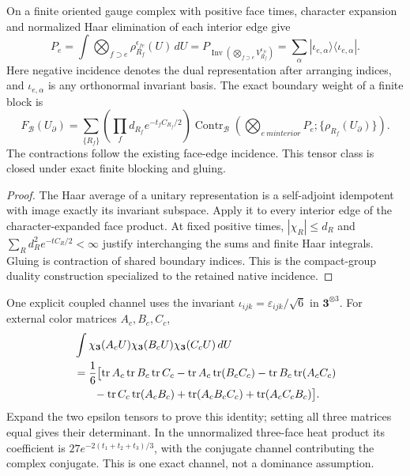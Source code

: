 \documentclass[12pt,a4paper]{article}
\begin{document}
\begin{theorem}
\label{p10:thm:v199-haar-interaction-compiler}
On a finite oriented gauge complex with positive face times, character
expansion and normalized Haar elimination of each interior edge give
\begin{equation}
 P_e=\int\bigotimes_{f\supset e}\rho_{R_f}^{\epsilon_{fe}}(U)\,dU
 =P_{\operatorname{Inv}(\bigotimes_{f\supset e}V_{R_f}^{\epsilon_{fe}})}
 =\sum_\alpha|\iota_{e,\alpha}\rangle\langle\iota_{e,\alpha}|.
 \label{p10:eq:v199-haar-projector}
\end{equation}
Here negative incidence denotes the dual representation after arranging
indices, and \(\iota_{e,\alpha}\) is any orthonormal invariant basis.
The exact boundary weight of a finite block is
\begin{equation}
 F_{\mathcal B}(U_\partial)=\sum_{\{R_f\}}
 \left(\prod_f d_{R_f}e^{-t_fC_{R_f}/2}\right)
 \operatorname{Contr}_{\mathcal B}
 \left(\bigotimes_{e\ {
m interior}}P_e;
          \{\rho_{R_f}(U_\partial)\}\right).
 \label{p10:eq:v199-blocked-tensor-weight}
\end{equation}
The contractions follow the existing face-edge incidence.  This tensor class
is closed under exact finite blocking and gluing.
\end{theorem}
\begin{proof}
The Haar average of a unitary representation is a self-adjoint idempotent
with image exactly its invariant subspace.  Apply it to every interior
edge of the character-expanded face product.  At fixed positive times,
\(|\chi_R|\le d_R\) and \(\sum_Rd_R^2e^{-tC_R/2}<\infty\) justify
interchanging the sums and finite Haar integrals.  Gluing is contraction of
shared boundary indices.  This is the compact-group duality construction
\cite{OecklPfeiffer2001Dual} specialized to the retained native incidence.
\end{proof}

One explicit coupled channel uses the invariant
\(\iota_{ijk}=\varepsilon_{ijk}/\sqrt6\) in \(\mathbf3^{\otimes3}\).
For external color matrices \(A_c,B_c,C_c\),
\begin{align}
 &\int\chi_{\mathbf3}(A_cU)\chi_{\mathbf3}(B_cU)
                  \chi_{\mathbf3}(C_cU)\,dU\nonumber\\
 &=\frac16\bigl[\operatorname{tr}A_c\operatorname{tr}B_c\operatorname{tr}C_c
 -\operatorname{tr}A_c\operatorname{tr}(B_cC_c)
 -\operatorname{tr}B_c\operatorname{tr}(A_cC_c)\nonumber\\
 &\hspace{1.8em}-\operatorname{tr}C_c\operatorname{tr}(A_cB_c)
 +\operatorname{tr}(A_cB_cC_c)+\operatorname{tr}(A_cC_cB_c)\bigr].
 \label{p10:eq:v199-three-face-channel}
\end{align}
Expand the two epsilon tensors to prove this identity; setting all three
matrices equal gives their determinant.  In the unnormalized three-face
heat product its coefficient is \(27e^{-2(t_1+t_2+t_3)/3}\), with the
conjugate channel contributing the complex conjugate.  This is one exact
channel, not a dominance assumption.
\end{document}
